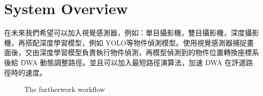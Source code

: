 \documentclass[crop=false]{standalone}
\begin{document}
	\section{System Overview}
	
	在未來我們希望可以加入視覺感測器，例如：單目攝影機，雙目攝影機，深度攝影機，再搭配深度學習模型，例如 YOLO等物件偵測模型。使用視覺感測器捕捉畫面後，交由深度學習模型負責執行物件偵測，再模型偵測到的物件位置轉換座標系後給 DWA 動態調整路徑。並且可以加入最短路徑演算法，加速 DWA 在評選路徑時的速度。
	
	\begin{figure*}[thbp!]
		\centering
		\caption{The furtherwork workflow}
		\label{fig:furtherwork}
	\end{figure*}
\end{document}
